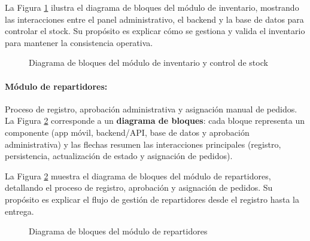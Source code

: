  La Figura \ref{fig:modulo-inventario} ilustra el diagrama de bloques del módulo de inventario, mostrando las interacciones entre el panel administrativo, el backend y la base de datos para controlar el stock. Su propósito es explicar cómo se gestiona y valida el inventario para mantener la consistencia operativa.

  \begin{figure}[htbp]
  \centering
  \resizebox{0.85\textwidth}{!}{}
  \caption[Módulo inventario (bloques)]{Diagrama de bloques del módulo de inventario y control de stock}
  \label{fig:modulo-inventario}
  \end{figure}

  \paragraph{Módulo de repartidores:}
  Proceso de registro, aprobación administrativa y asignación manual de pedidos. La Figura \ref{fig:modulo-repartidores} corresponde a un \textbf{diagrama de bloques}: cada bloque representa un componente (app móvil, backend/API, base de datos y aprobación administrativa) y las flechas resumen las interacciones principales (registro, persistencia, actualización de estado y asignación de pedidos).

  La Figura \ref{fig:modulo-repartidores} muestra el diagrama de bloques del módulo de repartidores, detallando el proceso de registro, aprobación y asignación de pedidos. Su propósito es explicar el flujo de gestión de repartidores desde el registro hasta la entrega.

  \begin{figure}[htbp]
  \centering
  \resizebox{0.85\textwidth}{!}{}
  \caption[Módulo repartidores (bloques)]{Diagrama de bloques del módulo de repartidores}
  \label{fig:modulo-repartidores}
  \end{figure}

